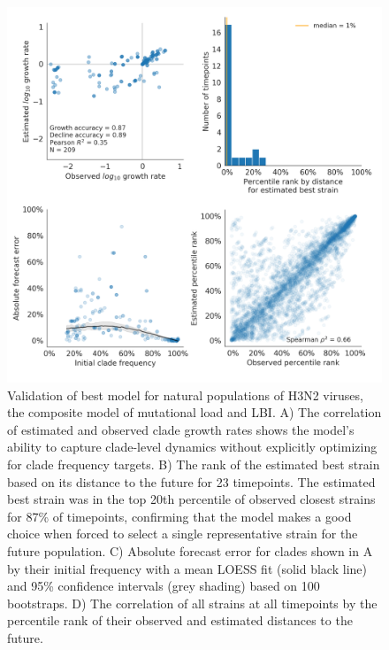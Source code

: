\begin{figure}[H]
  \begin{center}
  \includegraphics[width=\textwidth]{figures/validation-of-best-model-for-natural-populations.png}
  \caption{
  Validation of best model for natural populations of H3N2 viruses, the composite model of mutational load and LBI.
  A) The correlation of estimated and observed clade growth rates shows the model's ability to capture clade-level dynamics without explicitly optimizing for clade frequency targets.
  B) The rank of the estimated best strain based on its distance to the future for 23 timepoints.
  The estimated best strain was in the top 20th percentile of observed closest strains for 87\% of timepoints, confirming that the model makes a good choice when forced to select a single representative strain for the future population.
  C) Absolute forecast error for clades shown in A by their initial frequency with a mean LOESS fit (solid black line) and 95\% confidence intervals (grey shading) based on 100 bootstraps.
  D) The correlation of all strains at all timepoints by the percentile rank of their observed and estimated distances to the future.
  }
  \label{sup_fig:validation_of_best_model_for_natural_populations}
  \end{center}
\end{figure}

